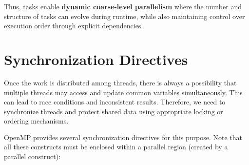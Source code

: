 \documentclass[12pt]{book}
\begin{document}
Thus, tasks enable \textbf{dynamic coarse-level parallelism} where the number and structure of tasks can evolve during runtime, while also maintaining control over execution order through explicit dependencies.


\section{Synchronization Directives}

Once the work is distributed among threads, there is always a possibility that multiple threads may access and update common variables simultaneously. This can lead to race conditions and inconsistent results. Therefore, we need to synchronize threads and protect shared data using appropriate locking or ordering mechanisms.

OpenMP provides several synchronization directives for this purpose. Note that all these constructs must be enclosed within a parallel region (created by a parallel construct):
\end{document}
